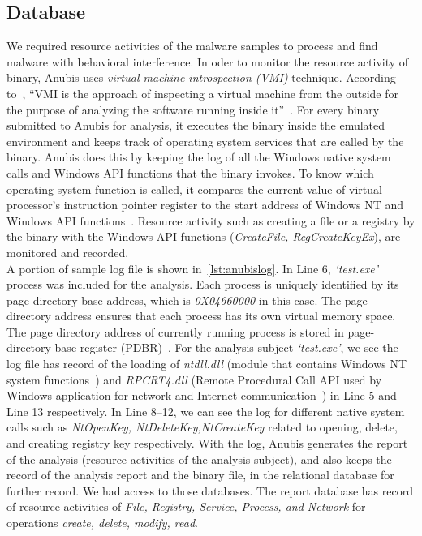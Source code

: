 \subsection{Database}
\label{sub:Database}
We required resource activities of the malware samples to process and find malware with behavioral interference.
In oder to monitor the resource activity of binary, Anubis uses \emph{virtual machine introspection (VMI)} technique.
According to~\citeauthor{vmi}, ``VMI is the approach of inspecting a virtual machine from the outside for the purpose of analyzing the software running inside it''~\cite[VMI]{vmi}.
For every binary submitted to Anubis for analysis, it executes the binary inside the emulated environment and keeps track of operating system services that are called by the binary.
Anubis does this by keeping the log of all the Windows native system calls and Windows API functions that the binary invokes.
To know which operating system function is called, it compares the current value of virtual processor's instruction pointer register to the start address of Windows NT and Windows API functions~\cite[]{ttanalyze}.
Resource activity such as creating a file or a registry by the binary with the Windows API functions (\emph{CreateFile, RegCreateKeyEx}), are monitored and recorded.\\

A portion of sample log file is shown in~\autoref{lst:anubislog}.
In Line 6, \emph{`test.exe'} process was included for the analysis.
Each process is uniquely identified by its page directory base address, which is \emph{0X04660000} in this case. %
The page directory address ensures that each process has its own virtual memory space.
The page directory address of currently running process is stored in page-directory base register (PDBR)~\cite[]{ttanalyze}.
For the analysis subject \emph{`test.exe'}, we see the log file has record of the loading of \emph{ntdll.dll} (module that contains Windows NT system functions~\cite[]{ntdll}) and \emph{RPCRT4.dll} (Remote Procedural Call API used by Windows application for network and Internet communication~\cite[]{rpcrt}) in Line 5 and Line 13 respectively.
In Line 8--12, we can see the log for different native system calls such as \emph{NtOpenKey, NtDeleteKey,NtCreateKey} related to opening, delete, and creating registry key respectively.
With the log, Anubis generates the report of the analysis (resource activities of the analysis subject), and also keeps the record of the analysis report and the binary file, in the relational database for further record.
We had access to those databases.
The report database has record of resource activities of \emph{File, Registry, Service, Process, and Network} for operations \emph{create, delete, modify, read}.\\

